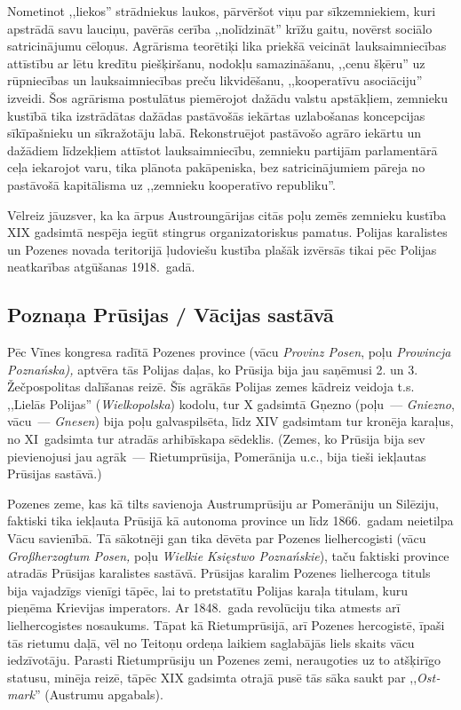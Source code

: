 \documentclass[twoside,a5paper,12pt,fleqn,openany]{extbook}
\newcommand{\pltxti}[1]{\textit{\textpolish{#1}}}
\newcommand{\detxti}[1]{\textit{\textgerman{#1}}}
\begin{document}
Nometinot ,,liekos'' strādniekus laukos, pārvēršot viņu par sīkzemniekiem, kuri apstrādā savu lauciņu, pavērās cerība ,,nolīdzināt'' krīžu gaitu, novērst sociālo satricinājumu cēloņus. Agrārisma teorētiķi lika priekšā veicināt lauksaimniecības attīstību ar lētu kredītu piešķiršanu, nodokļu samazināšanu, ,,cenu šķēru'' uz rūpniecības un lauksaimniecības preču likvidēšanu, ,,kooperatīvu asociāciju'' izveidi. Šos agrārisma postulātus piemērojot dažādu valstu apstākļiem, zemnieku kustībā tika izstrādātas dažādas pastāvošās iekārtas uzlabošanas koncepcijas sīkīpašnieku un sīkražotāju labā. Rekonstruējot pastāvošo agrāro iekārtu un dažādiem līdzekļiem attīstot lauksaimniecību, zemnieku partijām parlamentārā ceļa iekarojot varu, tika plānota pakāpeniska, bez satricinājumiem pāreja no pastāvošā kapitālisma uz ,,zemnieku kooperatīvo republiku''.

Vēlreiz jāuzsver, ka ka ārpus Austroungārijas citās poļu zemēs zemnieku kustība XIX gadsimtā nespēja iegūt stingrus organizatoriskus pamatus. Polijas karalistes un Pozenes novada teritorijā ļudoviešu kustība plašāk izvērsās tikai pēc Polijas neatkarības atgūšanas 1918.~gadā.

\subsection{Poznaņa Prūsijas / Vācijas sastāvā}

Pēc Vīnes kongresa radītā Pozenes province (vācu \detxti{Provinz Posen}, poļu \pltxti{Prowincja Poznańska),} aptvēra tās Polijas daļas, ko Prūsija bija jau saņēmusi 2. un 3. Žečpospolitas dalīšanas reizē. Šīs agrākās Polijas zemes kādreiz veidoja t.s. ,,Lielās Polijas'' (\pltxti{Wielkopolska}) kodolu, tur X gadsimtā Gņezno (poļu~--- \pltxti{Gniezno}, vācu~--- \detxti{Gnesen}) bija poļu galvaspilsēta, līdz XIV gadsimtam tur kronēja karaļus, no XI~gadsimta tur atradās arhibīskapa sēdeklis. (Zemes, ko Prūsija bija sev pievienojusi jau agrāk~--- Rietumprūsija, Pomerānija u.c., bija tieši iekļautas Prūsijas sastāvā.)

Pozenes zeme, kas kā tilts savienoja Austrumprūsiju ar Pomerāniju un Silēziju, faktiski tika iekļauta Prūsijā kā autonoma province un līdz 1866.~gadam neietilpa Vācu savienībā. Tā sākotnēji gan tika dēvēta par Pozenes lielhercogisti (vācu \detxti{Großherzogtum Posen,} poļu \pltxti{Wielkie Księstwo Poznańskie}), taču faktiski province atradās Prūsijas karalistes sastāvā. Prūsijas karalim Pozenes lielhercoga tituls bija vajadzīgs vienīgi tāpēc, lai to pretstatītu Polijas karaļa titulam, kuru pieņēma Krievijas imperators. Ar 1848.~gada revolūciju tika atmests arī lielhercogistes nosaukums. Tāpat kā Rietumprūsijā, arī Pozenes hercogistē, īpaši tās rietumu daļā, vēl no Teitoņu ordeņa laikiem saglabājās liels skaits vācu iedzīvotāju. Parasti Rietumprūsiju un Pozenes zemi, neraugoties uz to atšķirīgo statusu, minēja reizē, tāpēc XIX gadsimta otrajā pusē tās sāka saukt par ,,\detxti{Ostmark}'' (Austrumu apgabals).
\end{document}
